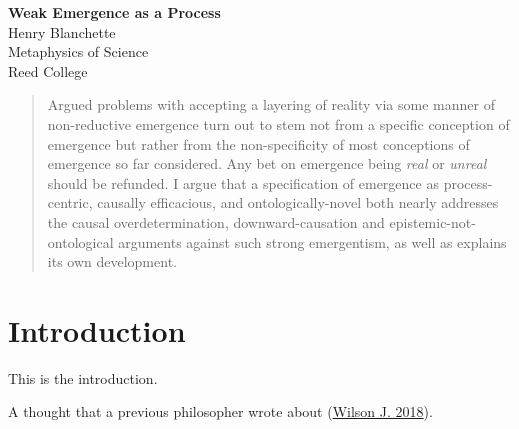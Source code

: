 \documentclass{article}
\newcommand{\ti}[1]{\textit{#1}}
\renewcommand{\cite}[1]{\hyperlink{#1}{#1}}
\begin{document}

\begin{center}
	\huge{\bf Weak Emergence as a Process} %
    \\[0.75cm] 
	\large{Henry Blanchette} %
    \\[0.5cm]
	\large{Metaphysics of Science \\ Reed College} %
    \\[1.0cm]
\end{center}

\begin{abstract}
	Argued problems with accepting a layering of reality via some manner of non-reductive emergence turn out to stem not from a specific conception of emergence but rather from the non-specificity of most conceptions of emergence so far considered. Any bet on emergence being \ti{real} or \ti{unreal} should be refunded. I argue that a specification of emergence as process-centric, causally efficacious, and ontologically-novel both nearly addresses the causal overdetermination, downward-causation and epistemic-not-ontological arguments against such strong emergentism, as well as explains its own development.
\end{abstract}

\section{Introduction}

This is the introduction.

A thought that a previous philosopher wrote about (\cite{Wilson J. 2018}).

\newpage
\end{document}
